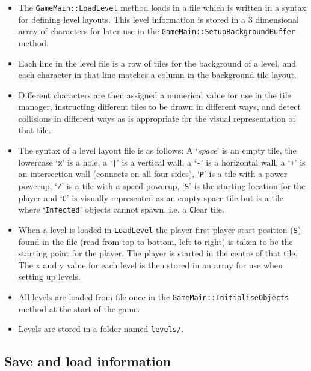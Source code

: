 \begin{itemize}
	\item The \verb!GameMain::LoadLevel! method loads in a file which is written in a syntax for defining level layouts. This level information is stored in a 3 dimensional array of characters for later use in the \verb!GameMain::SetupBackgroundBuffer! method.
	\item Each line in the level file is a row of tiles for the background of a level, and each character in that line matches a column in the background tile layout.
	\item Different characters are then assigned a numerical value for use in the tile manager, instructing different tiles to be drawn in different ways, and detect collisions in different ways as is appropriate for the visual representation of that tile.
	\item The syntax of a level layout file is as follows: A `\emph{space}' is an empty tile, the lowercase `\verb!x!' is a hole, a `\verb!|!' is a vertical wall, a `\verb!-!' is a horizontal wall, a `\verb!+!' is an intersection wall (connects on all four sides), `\verb!P!' is a tile with a power powerup, `\verb!Z!' is a tile with a speed powerup, `\verb!S!' is the starting location for the player and `\verb!C!' is visually represented as an empty space tile but is a tile where `\verb!Infected!' objects cannot spawn, i.e. a \verb!C!lear tile.
	\item When a level is loaded in \verb!LoadLevel! the player first player start position (\verb!S!) found in the file (read from top to bottom, left to right) is taken to be the starting point for the player. The player is started in the centre of that tile. The x and y value for each level is then stored in an array for use when setting up levels.
	\item All levels are loaded from file once in the \verb!GameMain::InitialiseObjects! method at the start of the game.
	\item Levels are stored in a folder named \verb!levels/!.
\end{itemize}

\subsection{Save and load information}

